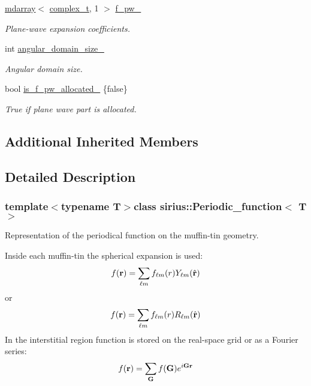 \begin{DoxyCompactItemize}
\item 
\hyperlink{classsddk_1_1mdarray}{mdarray}$<$ \hyperlink{classsirius_1_1_periodic__function_ab8dd7265e22b9321a85d3d63c3874918}{complex\+\_\+t}, 1 $>$ \hyperlink{classsirius_1_1_periodic__function_a3ba5873e5d97bf83597353435218da22}{f\+\_\+pw\+\_\+}
\begin{DoxyCompactList}\small\item\em Plane-\/wave expansion coefficients. \end{DoxyCompactList}\item 
int \hyperlink{classsirius_1_1_periodic__function_ad81954b5a43ca99654a19c0437579f82}{angular\+\_\+domain\+\_\+size\+\_\+}
\begin{DoxyCompactList}\small\item\em Angular domain size. \end{DoxyCompactList}\item 
bool \hyperlink{classsirius_1_1_periodic__function_aa7ee96ee3db228d74823a3c2f8b0dfe0}{is\+\_\+f\+\_\+pw\+\_\+allocated\+\_\+} \{false\}
\begin{DoxyCompactList}\small\item\em True if plane wave part is allocated. \end{DoxyCompactList}\end{DoxyCompactItemize}
\subsection*{Additional Inherited Members}


\subsection{Detailed Description}
\subsubsection*{template$<$typename T$>$class sirius\+::\+Periodic\+\_\+function$<$ T $>$}

Representation of the periodical function on the muffin-\/tin geometry. 

Inside each muffin-\/tin the spherical expansion is used\+: \[ f({\bf r}) = \sum_{\ell m} f_{\ell m}(r) Y_{\ell m}(\hat {\bf r}) \] or \[ f({\bf r}) = \sum_{\ell m} f_{\ell m}(r) R_{\ell m}(\hat {\bf r}) \] In the interstitial region function is stored on the real-\/space grid or as a Fourier series\+: \[ f({\bf r}) = \sum_{{\bf G}} f({\bf G}) e^{i{\bf G}{\bf r}} \] 

